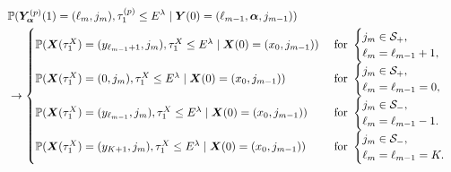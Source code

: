 \begin{align}
	& \mathbb P(\bm{Y}_{\bm{\alpha}}^{(p)}(1) = (\ell_m, j_m), \tau_{1}^{(p)}\leq E^\lambda 
            	 \mid \boldsymbol Y(0) = (\ell_{m-1},\boldsymbol \alpha, j_{m-1}))\nonumber
	\\&\to\begin{cases}
	 	\mathbb P(\boldsymbol X(\tau_1^X) =( y_{\ell_{m-1}+1},j_m), \tau_{1}^X\leq E^\lambda 
            	 \mid \boldsymbol X(0) = (x_0, j_{m-1}))  
	 &\text{ for }\begin{cases} j_m\in\mathcal{S}_+,\\ \ell_m=\ell_{m-1}+1,\end{cases}\\
	 \mathbb P(\boldsymbol X(\tau_1^X) =( 0,j_m), \tau_{1}^X\leq E^\lambda 
            	 \mid \boldsymbol X(0) = (x_0, j_{m-1}))  
	 &\text{ for }\begin{cases} j_m\in\mathcal{S}_+,\\ \ell_m=\ell_{m-1}=0,\end{cases}\\
	\mathbb P(\boldsymbol X(\tau_1^X) = (y_{\ell_{m-1}}, j_m), \tau_{1}^X\leq E^\lambda 
		\mid \boldsymbol X(0) = (x_0, j_{m-1}))  & \text{ for }\begin{cases}j_m\in\mathcal{S}_-,&\\ \ell_m=\ell_{m-1}-1.&\end{cases}\\
	\mathbb P(\boldsymbol X(\tau_1^X) = (y_{K+1}, j_m), \tau_{1}^X\leq E^\lambda 
		\mid \boldsymbol X(0) = (x_0, j_{m-1}))  & \text{ for }\begin{cases}j_m\in\mathcal{S}_-,&\\ \ell_m=\ell_{m-1}=K.&\end{cases}
\end{cases}\label{eqn:kknvf fawoprgj v2}
\end{align}


